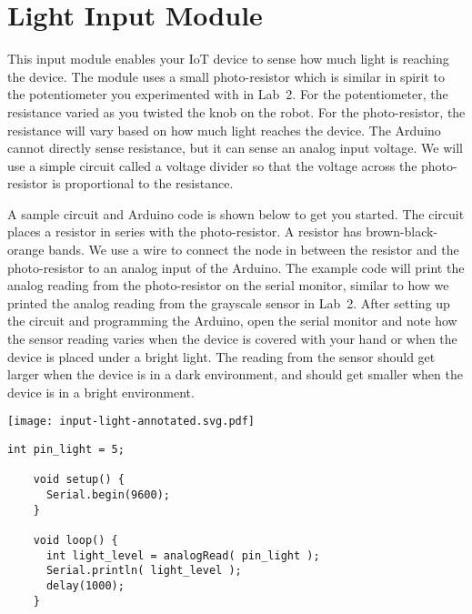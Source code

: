 
\clearpage
\section{Light Input Module}
\label{sec-input-light}

This input module enables your IoT device to sense how much light is
reaching the device. The module uses a small photo-resistor which is
similar in spirit to the potentiometer you experimented with in Lab~2.
For the potentiometer, the resistance varied as you twisted the knob on
the robot. For the photo-resistor, the resistance will vary based on how
much light reaches the device. The Arduino cannot directly sense
resistance, but it can sense an analog input voltage. We will use a
simple circuit called a voltage divider so that the voltage across the
photo-resistor is proportional to the resistance.

A sample circuit and Arduino code is shown below to get you started. The
circuit places a  resistor in series with the
photo-resistor. A  resistor has brown-black-orange
bands. We use a wire to connect the node in between the resistor and the
photo-resistor to an analog input of the Arduino. The example code will
print the analog reading from the photo-resistor on the serial monitor,
similar to how we printed the analog reading from the grayscale sensor in
Lab~2. After setting up the circuit and programming the Arduino, open the
serial monitor and note how the sensor reading varies when the device is
covered with your hand or when the device is placed under a bright light.
The reading from the sensor should get larger when the device is in a
dark environment, and should get smaller when the device is in a bright
environment.

\vspace{0.1in}
\begin{minipage}[t]{0.49\tw}
  \vspace{0pt}

  \texttt{[image: input-light-annotated.svg.pdf]}
\end{minipage}
\hfill
\begin{minipage}[t]{0.49\tw}
  \vspace{0.1in}
  \begin{Verbatim}[gobble=3,fontsize=\small]
    int pin_light = 5;

    void setup() {
      Serial.begin(9600);
    }

    void loop() {
      int light_level = analogRead( pin_light );
      Serial.println( light_level );
      delay(1000);
    }
  \end{Verbatim}
\end{minipage}

